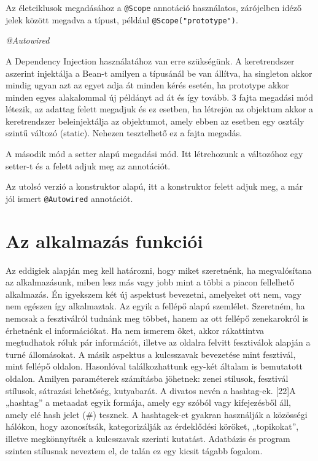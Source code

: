 \documentclass[11pt]{article}
\begin{document}
Az életciklusok megadásához a \texttt{@Scope} annotáció használatos, zárójelben idéző jelek között megadva a típust, például \texttt{@Scope("prototype")}.

\textit{@Autowired}

A Dependency Injection használatához van erre szükségünk. A keretrendszer aszerint injektálja a Bean-t amilyen a típusánál be van állítva, ha singleton akkor mindig ugyan azt az egyet adja át minden kérés esetén, ha prototype akkor minden egyes alakalommal új példányt ad át és így tovább.
3 fajta megadási mód létezik, az adattag felett megadjuk és ez esetben, ha létrejön az objektum akkor a keretrendszer beleinjektálja az objektumot, amely ebben az esetben egy osztály szintű változó (static). Nehezen tesztelhető ez a fajta megadás.

A második mód a setter alapú megadási mód. Itt létrehozunk a változóhoz egy setter-t és a felett adjuk meg az annotációt.

Az utolsó verzió a konstruktor alapú, itt a konstruktor felett adjuk meg, a már jól ismert \texttt{@Autowired} annotációt.

\section{Az alkalmazás funkciói}

Az eddigiek alapján meg kell határozni, hogy miket szeretnénk, ha megvalósítana az alkalmazásunk, miben lesz más vagy jobb mint a többi a piacon fellelhető alkalmazás. Én igyekszem két új aspektust bevezetni, amelyeket ott nem, vagy nem egészen így alkalmaztak. Az egyik a fellépő alapú szemlélet. Szeretném, ha nemcsak a fesztiválról tudnánk meg többet, hanem az ott fellépő zenekarokról is érhetnénk el információkat. Ha nem ismerem őket, akkor rákattintva megtudhatok róluk pár információt, illetve az oldalra felvitt fesztiválok alapján a turné állomásokat. A másik aspektus a kulcsszavak bevezetése mint fesztivál, mint fellépő oldalon. Hasonlóval találkozhattunk egy-két általam is bemutatott oldalon. Amilyen paraméterek számításba jöhetnek: zenei stílusok, fesztivál stílusok, sátrazási lehetőség, kutyabarát. A divatos nevén a hashtag-ek.
[22]A „hashtag” a metaadat egyik formája, amely egy szóból vagy kifejezésből áll, amely elé hash jelet (\#) tesznek. A hashtagek-et gyakran használják a közösségi hálókon, hogy azonosítsák, kategorizálják az érdeklődési köröket, „topikokat”, illetve megkönnyítsék a kulcsszavak szerinti kutatást.
Adatbázis és program szinten stílusnak neveztem el, de talán ez egy kicsit tágabb fogalom.
\end{document}
